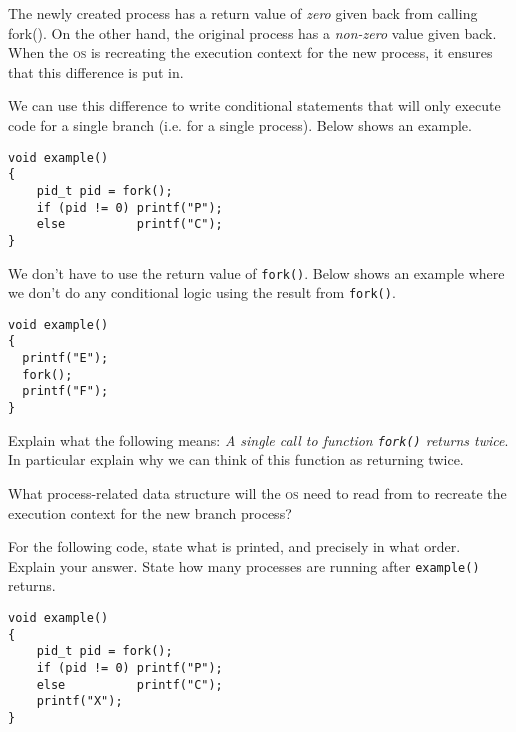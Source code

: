 The newly created process has a return value of \textit{zero} given back 
from calling fork(). On the other hand, the original process has a \textit{non-zero} 
value given back. When the \textsc{os} is recreating the execution context
for the new process, it ensures that this difference is put in.

We can use this difference to write conditional statements 
that will only execute code for a single branch (i.e. for a single process). 
Below shows an example.

\frmrule





\begin{example}
\begin{lstlisting}
void example()
{
	pid_t pid = fork();
	if (pid != 0) printf("P");
	else          printf("C");
}
\end{lstlisting}
\end{example}

\frmrule

We don't have to use the return value of \lstinline{fork()}. 
Below shows an example where we don't do any 
conditional logic using the result from \lstinline{fork()}.

\begin{example}
\begin{lstlisting}
void example()
{
  printf("E");
  fork();
  printf("F");
}
\end{lstlisting}
\end{example}


\frmrule


\begin{example}
Explain what the following 
means: \textit{A single call to function \lstinline{fork()} returns twice}.
In particular explain why we can think of this function as returning 
twice. 
\end{example}

\frmrule

\begin{example}
What process-related data structure will the \textsc{os} need to read from 
to recreate the execution context for the new branch process?
\end{example}

\frmrule


\begin{example}
For the following code, state what is printed, and precisely in what order.
Explain your answer. State how many processes are running 
after \lstinline{example()} returns.
\begin{lstlisting}
void example()
{
	pid_t pid = fork();
	if (pid != 0) printf("P");
	else          printf("C");
	printf("X");
}
\end{lstlisting}
\end{example}

